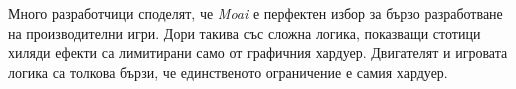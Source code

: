 			Много разработчици споделят, че \emph{Moai} е перфектен избор за бързо разработване на производителни игри.
			Дори такива със сложна логика, показващи стотици хиляди ефекти са лимитирани само от графичния хардуер.
			Двигателят и игровата логика са толкова бързи, че единственото ограничение е самия хардуер. \cite{Zipline}
			
			